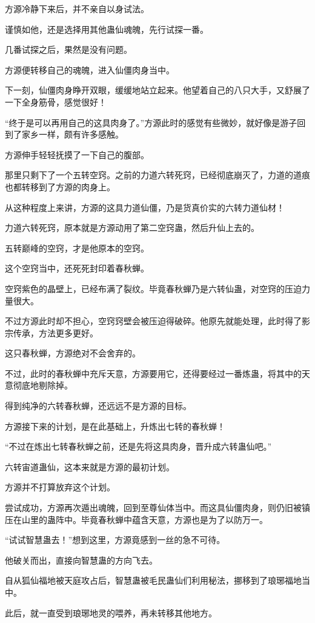 \begin{this_body}
方源冷静下来后，并不亲自以身试法。

谨慎如他，还是选择用其他蛊仙魂魄，先行试探一番。

几番试探之后，果然是没有问题。

方源便转移自己的魂魄，进入仙僵肉身当中。

下一刻，仙僵肉身睁开双眼，缓缓地站立起来。他望着自己的八只大手，又舒展了一下全身筋骨，感觉很好！

“终于是可以再用自己的这具肉身了。”方源此时的感觉有些微妙，就好像是游子回到了家乡一样，颇有许多感触。

方源伸手轻轻抚摸了一下自己的腹部。

那里只剩下了一个五转空窍。之前的力道六转死窍，已经彻底崩灭了，力道的道痕也都转移到了方源的肉身上。

从这种程度上来讲，方源的这具力道仙僵，乃是货真价实的六转力道仙材！

力道六转死窍，原本就是方源动用了第二空窍蛊，然后升仙上去的。

五转巅峰的空窍，才是他原本的空窍。

这个空窍当中，还死死封印着春秋蝉。

空窍紫色的晶壁上，已经布满了裂纹。毕竟春秋蝉乃是六转仙蛊，对空窍的压迫力量很大。

不过方源此时却不担心，空窍窍壁会被压迫得破碎。他原先就能处理，此时得了影宗传承，方法更多更好。

这只春秋蝉，方源绝对不会舍弃的。

不过，此时的春秋蝉中充斥天意，方源要用它，还得要经过一番炼蛊，将其中的天意彻底地剔除掉。

得到纯净的六转春秋蝉，还远远不是方源的目标。

方源接下来的计划，是在此基础上，升炼出七转的春秋蝉！

“不过在炼出七转春秋蝉之前，还是先将这具肉身，晋升成六转蛊仙吧。”

六转宙道蛊仙，这本来就是方源的最初计划。

方源并不打算放弃这个计划。

尝试成功，方源再次遁出魂魄，回到至尊仙体当中。而这具仙僵肉身，则仍旧被镇压在山里的蛊阵中。毕竟春秋蝉中蕴含天意，方源也是为了以防万一。

“试试智慧蛊去！”想到这里，方源竟感到一丝的急不可待。

他破关而出，直接向智慧蛊的方向飞去。

自从狐仙福地被天庭攻占后，智慧蛊被毛民蛊仙们利用秘法，挪移到了琅琊福地当中。

此后，就一直受到琅琊地灵的喂养，再未转移其他地方。


\end{this_body}
